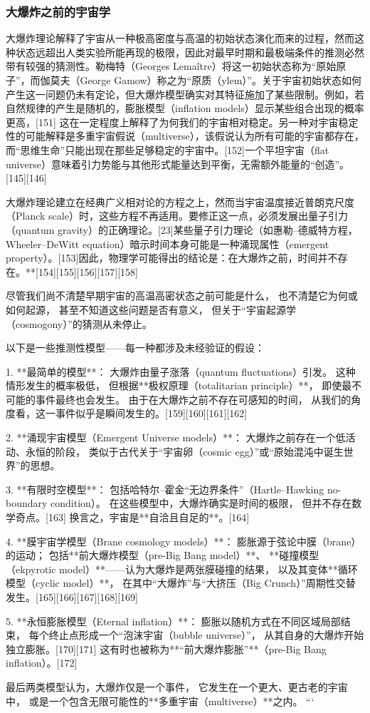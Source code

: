\subsubsection{大爆炸之前的宇宙学}
大爆炸理论解释了宇宙从一种极高密度与高温的初始状态演化而来的过程，然而这种状态远超出人类实验所能再现的极限，因此对最早时期和最极端条件的推测必然带有较强的猜测性。勒梅特（Georges Lemaître）将这一初始状态称为“原始原子”，而伽莫夫（George Gamow）称之为“原质（ylem）”。关于宇宙初始状态如何产生这一问题仍未有定论，但大爆炸模型确实对其特征施加了某些限制。例如，若自然规律的产生是随机的，膨胀模型（inflation models）显示某些组合出现的概率更高，[151]  
这在一定程度上解释了为何我们的宇宙相对稳定。另一种对宇宙稳定性的可能解释是多重宇宙假说（multiverse），该假说认为所有可能的宇宙都存在，而“思维生命”只能出现在那些足够稳定的宇宙中。[152]一个平坦宇宙（flat universe）意味着引力势能与其他形式能量达到平衡，无需额外能量的“创造”。[145][146]

大爆炸理论建立在经典广义相对论的方程之上，然而当宇宙温度接近普朗克尺度（Planck scale）时，这些方程不再适用。要修正这一点，必须发展出量子引力（quantum gravity）的正确理论。[23]某些量子引力理论（如惠勒–德威特方程，Wheeler–DeWitt equation）暗示时间本身可能是一种涌现属性（emergent property）。[153]因此，物理学可能得出的结论是：在大爆炸之前，时间并不存在。**[154][155][156][157][158]

尽管我们尚不清楚早期宇宙的高温高密状态之前可能是什么，  
也不清楚它为何或如何起源，  
甚至不知道这些问题是否有意义，  
但关于“宇宙起源学（cosmogony）”的猜测从未停止。

以下是一些推测性模型——每一种都涉及未经验证的假设：

1. **最简单的模型**：  
   大爆炸由量子涨落（quantum fluctuations）引发。  
   这种情形发生的概率极低，  
   但根据**极权原理（totalitarian principle）**，  
   即使最不可能的事件最终也会发生。  
   由于在大爆炸之前不存在可感知的时间，  
   从我们的角度看，这一事件似乎是瞬间发生的。[159][160][161][162]

2. **涌现宇宙模型（Emergent Universe models）**：  
   大爆炸之前存在一个低活动、永恒的阶段，  
   类似于古代关于“宇宙卵（cosmic egg）”或“原始混沌中诞生世界”的思想。

3. **有限时空模型**：  
   包括哈特尔–霍金“无边界条件”（Hartle–Hawking no-boundary condition）。  
   在这些模型中，大爆炸确实是时间的极限，  
   但并不存在数学奇点。[163]  
   换言之，宇宙是**自洽且自足的**。[164]

4. **膜宇宙学模型（Brane cosmology models）**：  
   膨胀源于弦论中膜（brane）的运动；  
   包括**前大爆炸模型（pre-Big Bang model）**、  
   **碰撞模型（ekpyrotic model）**——认为大爆炸是两张膜碰撞的结果，  
   以及其变体**循环模型（cyclic model）**，  
   在其中“大爆炸”与“大挤压（Big Crunch）”周期性交替发生。[165][166][167][168][169]

5. **永恒膨胀模型（Eternal inflation）**：  
   膨胀以随机方式在不同区域局部结束，  
   每个终止点形成一个“泡沫宇宙（bubble universe）”，  
   从其自身的大爆炸开始独立膨胀。[170][171]  
   这有时也被称为**“前大爆炸膨胀”**（pre-Big Bang inflation）。[172]

最后两类模型认为，大爆炸仅是一个事件，  
它发生在一个更大、更古老的宇宙中，  
或是一个包含无限可能性的**多重宇宙（multiverse）**之内。
```





